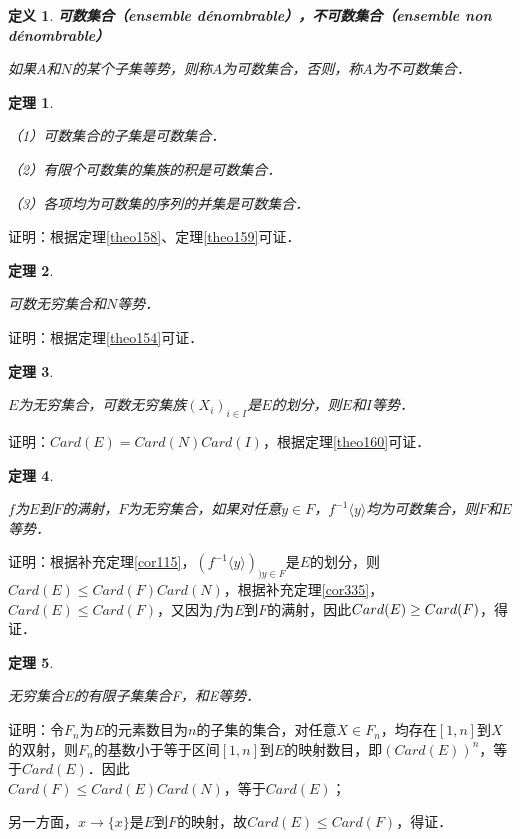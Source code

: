 \documentclass[12pt, a4paper, oneside]{book}
\newtheorem{theo}{定理}
\newtheorem{de}{定义}
\begin{document}
			\begin{de}
				\textbf{可数集合（ensemble dénombrable），不可数集合（ensemble non \\dénombrable）}
				\par
				如果$A$和$N$的某个子集等势，则称$A$为可数集合，否则，称$A$为不可数集合．
			\end{de}
			
			\begin{theo}\label{theo161}
				\hfill\par
				（1）可数集合的子集是可数集合．
				\par
				（2）有限个可数集的集族的积是可数集合．
				\par
				（3）各项均为可数集的序列的并集是可数集合．
			\end{theo}
			证明：根据定理\ref{theo158}、定理\ref{theo159}可证．
			
			\begin{theo}\label{theo162}
				\hfill\par
				可数无穷集合和$N$等势．
			\end{theo}
			证明：根据定理\ref{theo154}可证．
			
			\begin{theo}\label{theo163}
				\hfill\par
				$E$为无穷集合，可数无穷集族$(X_i)_{i\in I}$是$E$的划分，则$E$和$I$等势．
			\end{theo}
			证明：$Card(E)=Card(N)Card(I)$，根据定理\ref{theo160}可证．
			
			\begin{theo}\label{theo164}
				\hfill\par
				$f$为$E$到$F$的满射，$F$为无穷集合，如果对任意$y\in F$，$f^{-1}\langle y\rangle$均为可数集合，则$F$和$E$等势．
			\end{theo}
			证明：根据补充定理\ref{cor115}，$(f^{-1}\langle y\rangle)_{)y\in F}$是$E$的划分，则$Card(E)\leq Card(F)Card(N)$，根据补充定理\ref{cor335}，$Card(E)\leq Card(F)$，又因为$f$为$E$到$F$的满射，因此$Card(E)\geq \\Card(F)$，得证．
			
			\begin{theo}\label{theo165}
				\hfill\par
				无穷集合E的有限子集集合F，和E等势．
			\end{theo}
			证明：令$F_n$为$E$的元素数目为$n$的子集的集合，对任意$X\in F_n$，均存在$[1, n]$到$X$的双射，则$F_n$的基数小于等于区间$[1, n]$到$E$的映射数目，即$(Card(E))^n$，等于$Card(E)$．因此\\$Card(F)\leq Card(E)Card(N)$，等于$Card(E)$；
			\par
			另一方面，$x\to \{x\}$是$E$到$F$的映射，故$Card(E) \leq Card(F)$，得证．
			
\end{document}
